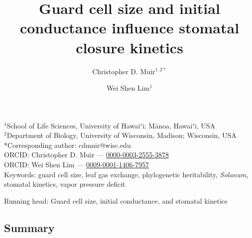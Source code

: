 \documentclass[
  letterpaper,
  DIV=11,
  numbers=noendperiod]{scrartcl}
\title{Guard cell size and initial conductance influence stomatal
closure kinetics}
\author{Christopher D. Muir\(^{1,2*}\) \and Wei Shen Lim\(^{1}\)}
\date{}
\begin{document}
\maketitle

\begin{center}
$^1$School of Life Sciences, University of Hawaiʻi; Mānoa, Hawaiʻi, USA\\
$^2$Department of Biology, University of Wisconsin, Madison; Wisconsin, USA\\
\medskip
*Corresponding author: cdmuir@wisc.edu\\
\medskip
ORCID: Christopher D. Muir — \href{https://orcid.org/0000-0003-2555-3878}{0000-0003-2555-3878}\\
ORCID: Wei Shen Lim — \href{https://orcid.org/0009-0001-1406-7957}{0009-0001-1406-7957}\\
\medskip
Keywords: guard cell size, leaf gas exchange, phylogenetic heritability, \textit{Solanum}, stomatal kinetics, vapor pressure deficit
\end{center}

\begin{flushleft}
Running head: Guard cell size, initial conductance, and stomatal kinetics
\end{flushleft}


\newpage{}

\subsection{Summary}\label{summary}
\end{document}
